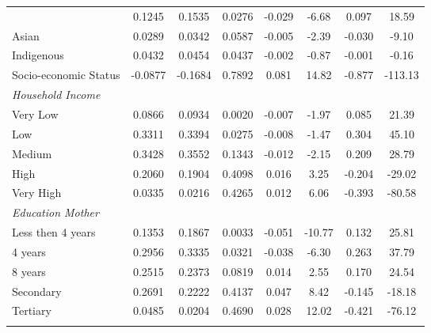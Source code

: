 \documentclass[a4paper, 12pt]{article}
\newcommand{\sym}[1]{\rlap{#1}}%
\begin{document}
\begin{longtable}{@{\extracolsep{1pt}}l*{7}{c}@{}}
\begin{adjustbox}{scale=0.9}
\begin{tabular}{l*{1}{ccccccc}}
Black       &      0.1245&      0.1535&      0.0276&       -0.029\sym{***}&       -6.68&       0.097\sym{***}&       18.59\\
Asian       &      0.0289&      0.0342&      0.0587&      -0.005\sym{**} &       -2.39&      -0.030\sym{***}&       -9.10\\
Indigenous  &      0.0432&      0.0454&      0.0437&      -0.002         &       -0.87&      -0.001         &       -0.16\\
Socio-economic Status&     -0.0877&     -0.1684&      0.7892&      0.081\sym{***}&       14.82&      -0.877\sym{***}&     -113.13\\
\emph{Household Income}&            &            &            &                     &            &                     &            \\
Very Low    &      0.0866&      0.0934&      0.0020&       -0.007\sym{**} &       -1.97&       0.085\sym{***}&       21.39\\
Low         &      0.3311&      0.3394&      0.0275&       -0.008         &       -1.47&       0.304\sym{***}&       45.10\\
Medium      &      0.3428&      0.3552&      0.1343&       -0.012\sym{**} &       -2.15&       0.209\sym{***}&       28.79\\
High        &      0.2060&      0.1904&      0.4098&      0.016\sym{***}&        3.25&      -0.204\sym{***}&      -29.02\\
Very High   &      0.0335&      0.0216&      0.4265&      0.012\sym{***}&        6.06&      -0.393\sym{***}&      -80.58\\
\emph{Education Mother}&            &            &            &                     &            &                     &            \\
Less then 4 years&      0.1353&      0.1867&      0.0033&       -0.051\sym{***}&      -10.77&       0.132\sym{***}&       25.81\\
4 years     &      0.2956&      0.3335&      0.0321&       -0.038\sym{***}&       -6.30&       0.263\sym{***}&       37.79\\
8 years     &      0.2515&      0.2373&      0.0819&       0.014\sym{**} &        2.55&       0.170\sym{***}&       24.54\\
Secondary   &      0.2691&      0.2222&      0.4137&      0.047\sym{***}&        8.42&      -0.145\sym{***}&      -18.18\\
Tertiary    &      0.0485&      0.0204&      0.4690&      0.028\sym{***}&       12.02&      -0.421\sym{***}&      -76.12\\

\end{tabular}
\end{adjustbox}
\end{longtable}
\end{document}
